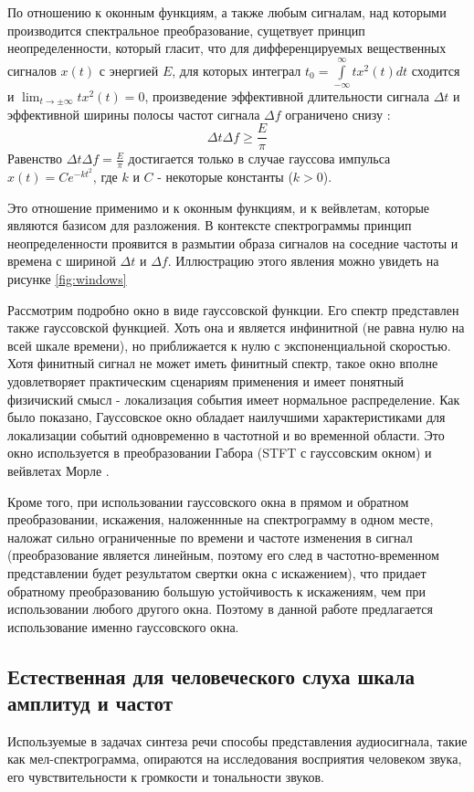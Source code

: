 По отношению к оконным функциям, а также любым сигналам, над которыми производится спектральное преобразование, сущетвует принцип неопределенности, который гласит, что
для дифференцируемых вещественных сигналов 
$x(t)$ с энергией $E$, для которых интеграл 
$t_{0} = \int \limits _{-\infty }^{\infty }tx^{2}(t)dt$ сходится и $\lim _{t\to \pm \infty }tx^{2}(t)=0$, произведение эффективной длительности сигнала 
$\Delta t$ и эффективной ширины полосы частот сигнала $\Delta f$ ограничено снизу \cite{Umnyashkin}:
\begin{equation}
  \Delta t\Delta f\geq {\frac {E}{\pi }}
  \label{eq:uncertainity}
\end{equation}
Равенство $\Delta t\Delta f={\frac {E}{\pi }}$ достигается только в случае гауссова импульса $x(t)=Ce^{-kt^{2}}$, где 
$k$ и $C$ - некоторые константы ($k>0$). \cite{Umnyashkin}

Это отношение применимо и к оконным функциям, и к вейвлетам, которые являются базисом для разложения. 
В контексте спектрограммы принцип неопределенности проявится в размытии образа сигналов на соседние частоты и времена с шириной $\Delta t$ и $\Delta f$.
Иллюстрацию этого явления можно увидеть на рисунке \ref{fig:windows}

Рассмотрим подробно окно в виде гауссовской функции. Его спектр представлен также гауссовской функцией. Хоть она и является инфинитной (не равна нулю на всей шкале времени),
но приближается к нулю с экспоненциальной скоростью. Хотя финитный сигнал не может иметь финитный спектр, 
такое окно вполне удовлетворяет практическим сценариям применения и имеет понятный физичиский смысл - локализация события имеет нормальное распределение.
Как было показано, Гауссовское окно обладает наилучшими характеристиками для локализации событий одновременно в частотной и во временной области.
Это окно используется в преобразовании Габора \cite{Gabor} (STFT с гауссовским окном) и вейвлетах Морле \cite{MorleWavelet}.

Кроме того, при использовании гауссовского окна в прямом и обратном преобразовании, искажения, наложеннные на спектрограмму в одном месте, наложат сильно ограниченные по времени и частоте изменения в сигнал 
(преобразование является линейным, поэтому его след в частотно-временном представлении будет результатом свертки окна с искажением), 
что придает обратному преобразованию большую устойчивость к искажениям, чем при использовании любого другого окна. 
Поэтому в данной работе предлагается использование именно гауссовского окна.

\subsection{Естественная для человеческого слуха шкала амплитуд и частот}
Используемые в задачах синтеза речи способы представления аудиосигнала, такие как мел-спектрограмма, опираются на исследования восприятия человеком звука, 
его чувствительности к громкости и тональности звуков. 

